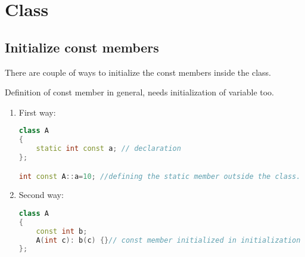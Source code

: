 
\chapter{Class}
\section{Initialize const members}
There are couple of ways to initialize the const members inside the class.

Definition of const member in general, needs initialization of variable too.

\begin{enumerate}
\item First way:
\begin{lstlisting}[language=C++]
class A
{
	static int const a; // declaration
};

int const A::a=10; //defining the static member outside the class.
\end{lstlisting}

\item Second way:
\begin{lstlisting}[language=C++]
class A
{
	const int b;
	A(int c): b(c) {}// const member initialized in initialization list.
};
\end{lstlisting}
\end{enumerate}

